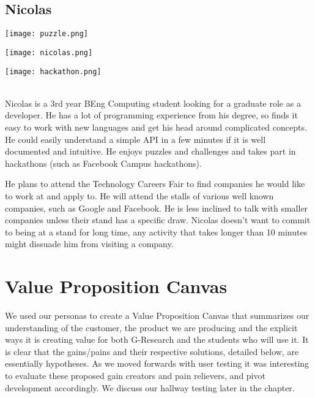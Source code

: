 \subsection{Nicolas}

\begin{minipage}{.333\textwidth}
  \centering
  \texttt{[image: puzzle.png]}
\end{minipage}%
\begin{minipage}{.333\textwidth}
  \centering
  \texttt{[image: nicolas.png]}
\end{minipage}
\begin{minipage}{.333\textwidth}
  \centering
  \texttt{[image: hackathon.png]}
\end{minipage}\\

Nicolas is a 3rd year BEng Computing student looking for a graduate role as a developer. He has a lot of programming experience from his degree, so finds it easy to work with new languages and get his head around complicated concepts. He could easily understand a simple API in a few minutes if it is well documented and intuitive. He enjoys puzzles and challenges and takes part in hackathons (such as Facebook Campus hackathons).

He plans to attend the Technology Careers Fair to find companies he would like to work at and apply to. He will attend the stalls of various well known companies, such as Google and Facebook. He is less inclined to talk with smaller companies unless their stand has a specific draw. Nicolas doesn't want to commit to being at a stand for long time, any activity that takes longer than 10 minutes might dissuade him from visiting a company. 

\section{Value Proposition Canvas}
We used our personas to create a Value Proposition Canvas that summarizes our understanding of the customer, the product we are producing and the explicit ways it is creating value for both G-Research and the students who will use it. It is clear that the gains/pains and their respective solutions, detailed below, are essentially hypotheses. As we moved forwards with user testing it was interesting to evaluate these proposed gain creators and pain relievers, and pivot development accordingly. We discuss our hallway testing later in the chapter. 

